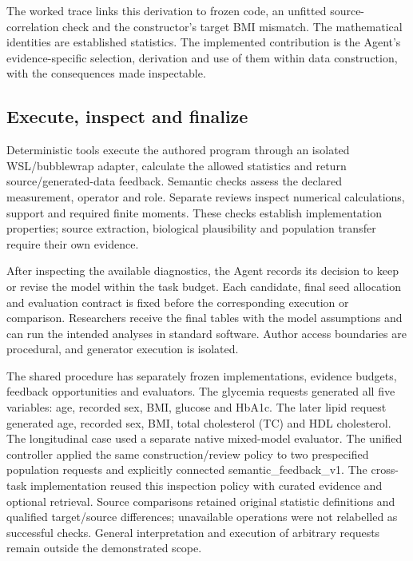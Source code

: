\documentclass[10pt,twocolumn]{article}
\begin{document}
The worked trace links this derivation to frozen code, an unfitted source-correlation check and the constructor's target BMI mismatch. The mathematical identities are established statistics. The implemented contribution is the Agent's evidence-specific selection, derivation and use of them within data construction, with the consequences made inspectable.


\subsection{Execute, inspect and finalize}

Deterministic tools execute the authored program through an isolated WSL/bubblewrap adapter, calculate the allowed statistics and return source/generated-data feedback. Semantic checks assess the declared measurement, operator and role. Separate reviews inspect numerical calculations, support and required finite moments. These checks establish implementation properties; source extraction, biological plausibility and population transfer require their own evidence.


After inspecting the available diagnostics, the Agent records its decision to keep or revise the model within the task budget. Each candidate, final seed allocation and evaluation contract is fixed before the corresponding execution or comparison. Researchers receive the final tables with the model assumptions and can run the intended analyses in standard software. Author access boundaries are procedural, and generator execution is isolated.


The shared procedure has separately frozen implementations, evidence budgets, feedback opportunities and evaluators. The glycemia requests generated all five variables: age, recorded sex, BMI, glucose and HbA1c. The later lipid request generated age, recorded sex, BMI, total cholesterol (TC) and HDL cholesterol. The longitudinal case used a separate native mixed-model evaluator. The unified controller applied the same construction/review policy to two prespecified population requests and explicitly connected semantic\_feedback\_v1. The cross-task implementation reused this inspection policy with curated evidence and optional retrieval. Source comparisons retained original statistic definitions and qualified target/source differences; unavailable operations were not relabelled as successful checks. General interpretation and execution of arbitrary requests remain outside the demonstrated scope.
\end{document}
